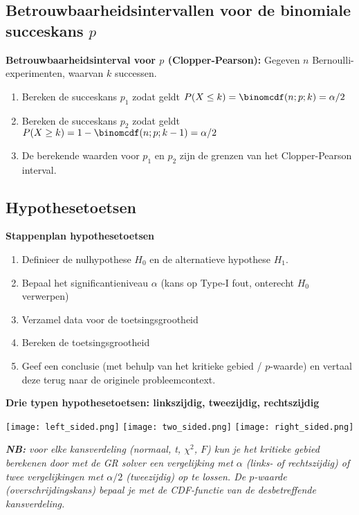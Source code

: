 \subsection*{Betrouwbaarheidsintervallen voor de binomiale succeskans $p$}
    \textbf{Betrouwbaarheidsinterval voor \boldmath$p$ (Clopper-Pearson):}
    Gegeven $n$ Bernoulli-experimenten, waarvan $k$ successen.
    \begin{enumerate}
        \item Bereken de succeskans $p_1$ zodat geldt $P(X \le k) = \binomcdf(n; p; k) = \alpha/2$
        \item Bereken de succeskans $p_2$ zodat geldt $P(X \ge k) = 1 - \binomcdf(n; p; k-1) = \alpha/2$
        \item De berekende waarden voor $p_1$ en $p_2$ zijn de grenzen van het Clopper-Pearson interval.
    \end{enumerate}

\subsection*{Hypothesetoetsen}
    \textbf{Stappenplan hypothesetoetsen}
    \begin{enumerate}
        \item Definieer de nulhypothese $H_0$ en de alternatieve hypothese $H_1$.
        \item Bepaal het significantieniveau $\alpha$ (kans op Type-I fout, onterecht $H_0$ verwerpen)
        \item Verzamel data voor de toetsingsgrootheid
        \item Bereken de toetsingsgrootheid
        \item Geef een conclusie (met behulp van het kritieke gebied / $p$-waarde) en vertaal deze terug naar de originele probleemcontext.
    \end{enumerate}

    \newpage
    \textbf{Drie typen hypothesetoetsen: linkszijdig, tweezijdig, rechtszijdig}
    \begin{center}
        \texttt{[image: left\_sided.png]}
        \texttt{[image: two\_sided.png]}
        \texttt{[image: right\_sided.png]}
    \end{center}
    {\itshape \textbf{NB:} voor elke kansverdeling (normaal, t, $\chi^2$, $F$) kun je het kritieke gebied berekenen door met de GR solver een vergelijking met $\alpha$ (links- of rechtszijdig) of twee vergelijkingen met $\alpha/2$ (tweezijdig) op te lossen. De $p$-waarde (overschrijdingskans) bepaal je met de CDF-functie van de desbetreffende kansverdeling.}


